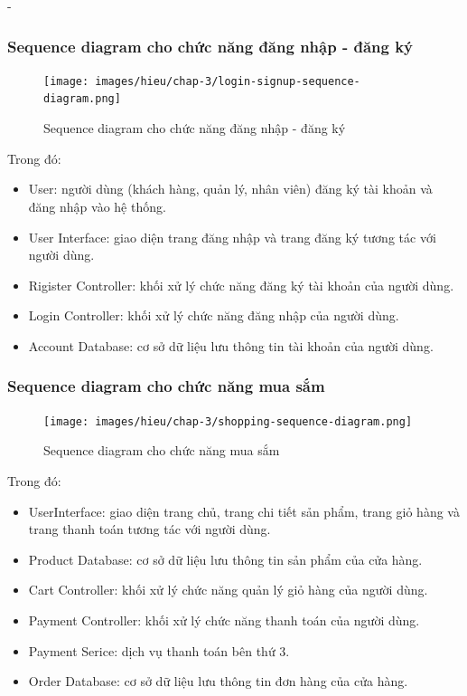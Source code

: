 \begin {list} {-}{}
\subsubsection{Sequence diagram cho chức năng đăng nhập - đăng ký}
\begin{figure}[H]
    \centering
    \texttt{[image: images/hieu/chap-3/login-signup-sequence-diagram.png]}
    \caption{Sequence diagram cho chức năng đăng nhập - đăng ký}
\end{figure}
\noindent Trong đó:
\begin{itemize}
    \item User: người dùng (khách hàng, quản lý, nhân viên) đăng ký tài khoản và đăng nhập vào hệ thống.
    \item User Interface: giao diện trang đăng nhập và trang đăng ký tương tác với người dùng.
    \item Rigister Controller: khối xử lý chức năng đăng ký tài khoản của người dùng.
    \item Login Controller: khối xử lý chức năng đăng nhập của người dùng.
    \item Account Database: cơ sở dữ liệu lưu thông tin tài khoản của người dùng.
\end{itemize}
\newpage
\subsubsection{Sequence diagram cho chức năng mua sắm}
\begin{figure}[H]
    \centering
    \texttt{[image: images/hieu/chap-3/shopping-sequence-diagram.png]}
    \caption{Sequence diagram cho chức năng mua sắm}
\end{figure}
\noindent Trong đó:
\begin{itemize}
    \item UserInterface: giao diện trang chủ, trang chi tiết sản phẩm, trang giỏ hàng và trang thanh toán tương tác với người dùng.
    \item Product Database: cơ sở dữ liệu lưu thông tin sản phẩm của cửa hàng.
    \item Cart Controller: khối xử lý chức năng quản lý giỏ hàng của người dùng.
    \item Payment Controller: khối xử lý chức năng thanh toán của người dùng.
    \item Payment Serice: dịch vụ thanh toán bên thứ 3.
    \item Order Database: cơ sở dữ liệu lưu thông tin đơn hàng của cửa hàng.
\end{itemize}
\newpage

\end{list}
